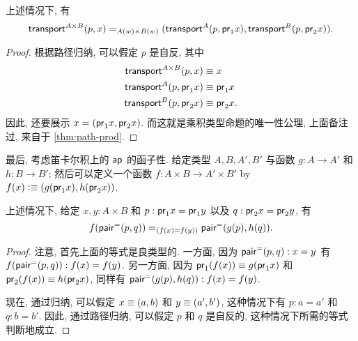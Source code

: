 \begin{thm}\label{thm:trans-prod}
  上述情况下, 有
  \[
  \id[A(w) \times B(w)]
  {\transfib{A\times B}px}
  {(\transfib{A}{p}{\proj{1}x}, \transfib{B}{p}{\proj{2}x})}.
  \]
\end{thm}
\begin{proof}
  根据路径归纳, 可以假定 $p$ 是自反, 其中
  \begin{align*}
    \transfib{A\times B}px&\jdeq x\\
    \transfib{A}{p}{\proj{1}x}&\jdeq \proj1x\\
    \transfib{B}{p}{\proj{2}x}&\jdeq \proj2x.
  \end{align*}
  因此, 还要展示 $x = (\proj1 x, \proj2x)$.
  而这就是乘积类型命题的唯一性公理, 上面备注过, 来自于 \cref{thm:path-prod}.
\end{proof}

最后, 考虑笛卡尔积上的 $\apfunc{}$ 的函子性.
给定类型 $A,B,A',B'$ 与函数 $g:A\to A'$ 和 $h:B\to B'$;
然后可以定义一个函数 $f:A\times B\to A'\times B'$ by $f(x) \defeq (g(\proj1x),h(\proj2x))$.

\begin{thm}\label{thm:ap-prod}
  上述情况下, 给定 $x,y:A\times B$ 和 $p:\proj1x=\proj1y$ 以及 $q:\proj2x=\proj2y$, 有
  \[ \id[(f(x)=f(y))]{\ap{f}{\pairpath(p,q)}} {\pairpath(\ap{g}{p},\ap{h}{q})}. \]
\end{thm}
\begin{proof}
  注意, 首先上面的等式是良类型的.
  一方面, 因为 $\pairpath(p,q):x=y$ 有 $\ap{f}{\pairpath(p,q)}:f(x)=f(y)$.
  另一方面, 因为 $\proj1(f(x))\jdeq g(\proj1x)$ 和 $\proj2(f(x))\jdeq h(\proj2x)$, 同样有 $\pairpath(\ap{g}{p},\ap{h}{q}):f(x)=f(y)$.

  现在, 通过归纳, 可以假定 $x\jdeq(a,b)$ 和 $y\jdeq(a',b')$, 这种情况下有 $p:a=a'$ 和 $q:b=b'$.
  因此, 通过路径归纳, 可以假定 $p$ 和 $q$ 是自反的, 这种情况下所需的等式判断地成立.
\end{proof}

%